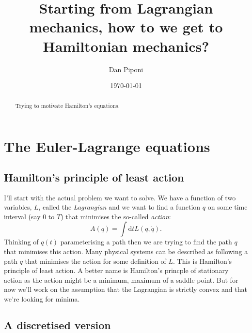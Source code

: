 \documentclass{article}
\begin{document}
\title{Starting from Lagrangian mechanics, how to we get to Hamiltonian mechanics?}
\author{Dan Piponi}
\date{\today}
\maketitle

\begin{abstract}
Trying to motivate Hamilton's equations.
\end{abstract}

\tableofcontents

\newcommand{\cD}{\mathcal{D}}
\newcommand{\rd}{\mathrm{d}}

\section{The Euler-Lagrange equations}
\subsection{Hamilton's principle of least action}
I'll start with the actual problem we want to solve.
We have a function of two variables, $L$, called the \emph{Lagrangian} and we want to find a function $q$ on some time interval (say $0$ to $T$) that minimises the so-called \emph{action}:
\[
A(q)=\int\rd tL(q,\dot{q}).
\]
Thinking of $q(t)$ parameterising a path then we are trying to find the path $q$ that minimises this action.
Many physical systems can be described as following a path $q$ that minimises the action for some definition of $L$.
This is Hamilton's principle of least action\cite{hamilton}.
A better name is Hamilton's princple of stationary action as the action might be a minimum, maximum of a saddle point.
But for now we'll work on the assumption that the Lagrangian is strictly convex and that we're looking for minima.

\subsection{A discretised version}
\newcommand{\Min}{\mathop{\mathrm{Min}}}
\newcommand{\Max}{\mathop{\mathrm{Max}}}
\end{document}
